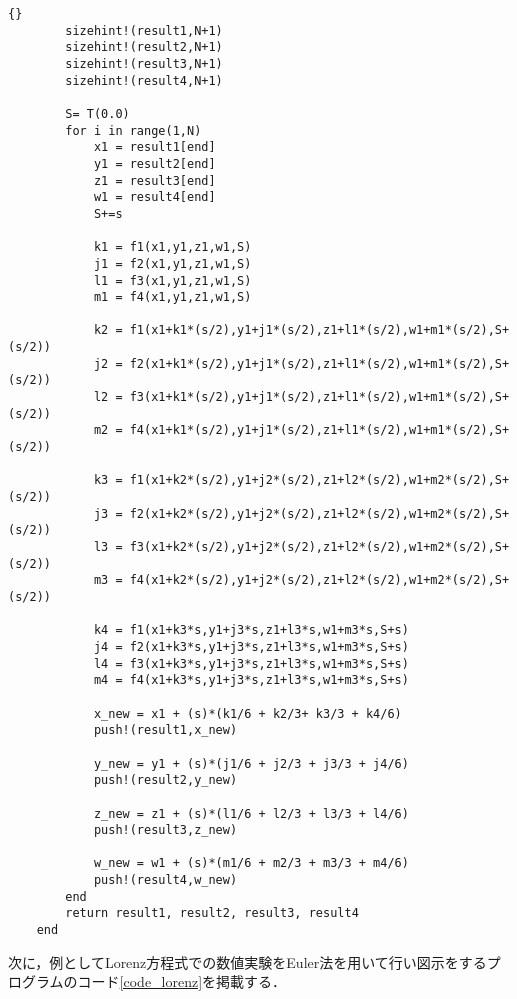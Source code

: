 \begin{lstlisting}[caption =\text{numerical\_scheme.jl}, label =code_numericalscheme]{}
        sizehint!(result1,N+1)
        sizehint!(result2,N+1)
        sizehint!(result3,N+1)
        sizehint!(result4,N+1)

        S= T(0.0)
        for i in range(1,N)
            x1 = result1[end]
            y1 = result2[end]
            z1 = result3[end]
            w1 = result4[end]
            S+=s

            k1 = f1(x1,y1,z1,w1,S)
            j1 = f2(x1,y1,z1,w1,S)
            l1 = f3(x1,y1,z1,w1,S)
            m1 = f4(x1,y1,z1,w1,S)

            k2 = f1(x1+k1*(s/2),y1+j1*(s/2),z1+l1*(s/2),w1+m1*(s/2),S+(s/2))
            j2 = f2(x1+k1*(s/2),y1+j1*(s/2),z1+l1*(s/2),w1+m1*(s/2),S+(s/2))
            l2 = f3(x1+k1*(s/2),y1+j1*(s/2),z1+l1*(s/2),w1+m1*(s/2),S+(s/2))
            m2 = f4(x1+k1*(s/2),y1+j1*(s/2),z1+l1*(s/2),w1+m1*(s/2),S+(s/2))

            k3 = f1(x1+k2*(s/2),y1+j2*(s/2),z1+l2*(s/2),w1+m2*(s/2),S+(s/2))
            j3 = f2(x1+k2*(s/2),y1+j2*(s/2),z1+l2*(s/2),w1+m2*(s/2),S+(s/2))
            l3 = f3(x1+k2*(s/2),y1+j2*(s/2),z1+l2*(s/2),w1+m2*(s/2),S+(s/2))
            m3 = f4(x1+k2*(s/2),y1+j2*(s/2),z1+l2*(s/2),w1+m2*(s/2),S+(s/2))

            k4 = f1(x1+k3*s,y1+j3*s,z1+l3*s,w1+m3*s,S+s)
            j4 = f2(x1+k3*s,y1+j3*s,z1+l3*s,w1+m3*s,S+s)
            l4 = f3(x1+k3*s,y1+j3*s,z1+l3*s,w1+m3*s,S+s)
            m4 = f4(x1+k3*s,y1+j3*s,z1+l3*s,w1+m3*s,S+s)

            x_new = x1 + (s)*(k1/6 + k2/3+ k3/3 + k4/6)
            push!(result1,x_new)

            y_new = y1 + (s)*(j1/6 + j2/3 + j3/3 + j4/6)
            push!(result2,y_new)

            z_new = z1 + (s)*(l1/6 + l2/3 + l3/3 + l4/6)
            push!(result3,z_new)

            w_new = w1 + (s)*(m1/6 + m2/3 + m3/3 + m4/6)
            push!(result4,w_new)
        end
        return result1, result2, result3, result4
    end
\end{lstlisting}

次に，例としてLorenz方程式での数値実験をEuler法を用いて行い図示をするプログラムのコード\ref{code_lorenz}を掲載する．

